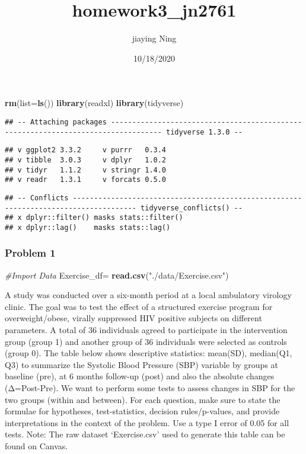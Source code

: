 \documentclass[]{article}
\title{homework3\_jn2761}
\author{jiaying Ning}
\date{10/18/2020}
\newenvironment{Shaded}{\begin{snugshade}}{\end{snugshade}}
\newcommand{\CommentTok}[1]{\textcolor[rgb]{0.56,0.35,0.01}{\textit{#1}}}
\newcommand{\DataTypeTok}[1]{\textcolor[rgb]{0.13,0.29,0.53}{#1}}
\newcommand{\KeywordTok}[1]{\textcolor[rgb]{0.13,0.29,0.53}{\textbf{#1}}}
\newcommand{\NormalTok}[1]{#1}
\newcommand{\StringTok}[1]{\textcolor[rgb]{0.31,0.60,0.02}{#1}}
\begin{document}
\maketitle

\begin{Shaded}
\begin{Highlighting}[]
\KeywordTok{rm}\NormalTok{(}\DataTypeTok{list=}\KeywordTok{ls}\NormalTok{())}
\KeywordTok{library}\NormalTok{(readxl)}
\KeywordTok{library}\NormalTok{(tidyverse)}
\end{Highlighting}
\end{Shaded}

\begin{verbatim}
## -- Attaching packages ---------------------------------------------------------------------------------- tidyverse 1.3.0 --
\end{verbatim}

\begin{verbatim}
## v ggplot2 3.3.2     v purrr   0.3.4
## v tibble  3.0.3     v dplyr   1.0.2
## v tidyr   1.1.2     v stringr 1.4.0
## v readr   1.3.1     v forcats 0.5.0
\end{verbatim}

\begin{verbatim}
## -- Conflicts ------------------------------------------------------------------------------------- tidyverse_conflicts() --
## x dplyr::filter() masks stats::filter()
## x dplyr::lag()    masks stats::lag()
\end{verbatim}

\hypertarget{problem-1}{%
\subsubsection{Problem 1}\label{problem-1}}

\begin{Shaded}
\begin{Highlighting}[]
\CommentTok{#Import Data }
\NormalTok{Exercise_df=}
\StringTok{   }\KeywordTok{read.csv}\NormalTok{(}\StringTok{"./data/Exercise.csv"}\NormalTok{)}
\end{Highlighting}
\end{Shaded}

A study was conducted over a six-month period at a local ambulatory
virology clinic. The goal was to test the effect of a structured
exercise program for overweight/obese, virally suppressed HIV positive
subjects on different parameters. A total of 36 individuals agreed to
participate in the intervention group (group 1) and another group of 36
individuals were selected as controls (group 0). The table below shows
descriptive statistics: mean(SD), median(Q1, Q3) to summarize the
Systolic Blood Pressure (SBP) variable by groups at baseline (pre), at 6
months follow-up (post) and also the absolute changes (Δ=Post-Pre). We
want to perform some tests to assess changes in SBP for the two groups
(within and between). For each question, make sure to state the formulae
for hypotheses, test-statistics, decision rules/p-values, and provide
interpretations in the context of the problem. Use a type I error of
0.05 for all tests. Note: The raw dataset `Exercise.csv' used to
generate this table can be found on Canvas.
\end{document}

